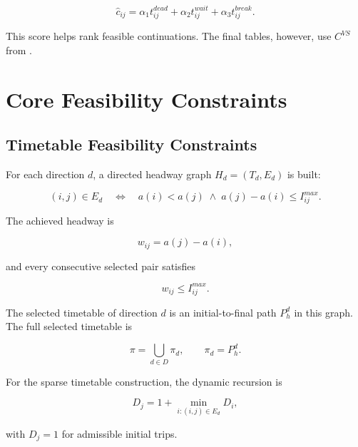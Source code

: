 \begin{equation}
\hat c_{ij}
=
\alpha_1t^{dead}_{ij}
+\alpha_2t^{wait}_{ij}
+\alpha_3t^{break}_{ij}.
\label{eq:model-edge-score}
\end{equation}

This score helps rank feasible continuations. The final tables, however, use
\(C^{VS}\) from .

\section{Core Feasibility Constraints}

\subsection{Timetable Feasibility Constraints}

For each direction \(d\), a directed headway graph \(H_d=(T_d,E_d)\) is built:

\begin{equation}
(i,j)\in E_d
\quad\Longleftrightarrow\quad
a(i)<a(j)
\;\wedge\;
a(j)-a(i)\le I^{max}_{ij}.
\label{eq:headway-edge}
\end{equation}

The achieved headway is

\begin{equation}
w_{ij}=a(j)-a(i),
\label{eq:headway}
\end{equation}

and every consecutive selected pair satisfies

\begin{equation}
w_{ij}\le I^{max}_{ij}.
\label{eq:headway-bound}
\end{equation}

The selected timetable of direction \(d\) is an initial-to-final path
\(P_h^d\) in this graph. The full selected timetable is

\begin{equation}
\pi=\bigcup_{d\in D}\pi_d,
\qquad
\pi_d=P_h^d .
\label{eq:selected-trips}
\end{equation}

For the sparse timetable construction, the dynamic recursion is

\begin{equation}
D_j=1+\min_{i:(i,j)\in E_d}D_i,
\label{eq:timetable-dp}
\end{equation}

with \(D_j=1\) for admissible initial trips.

